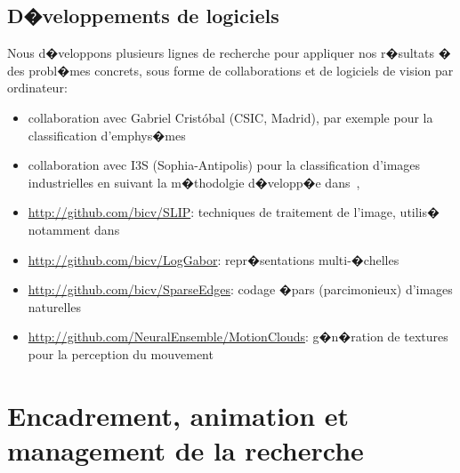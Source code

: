 \section{D�veloppements de logiciels} %

Nous d�veloppons plusieurs lignes de recherche pour appliquer nos r�sultats � des probl�mes concrets, sous forme de collaborations et de logiciels de vision par ordinateur:
\begin{itemize}
	\item  collaboration avec Gabriel Crist\'obal (CSIC, Madrid), par exemple pour la classification d'emphys�mes~\citep{Nava13} %
	\item  collaboration avec I3S (Sophia-Antipolis) pour la classification d'images industrielles en suivant la m�thodolgie d�velopp�e dans~\citep{PerrinetBednar15},
	\item \url{http://github.com/bicv/SLIP}: techniques de traitement de l'image, utilis� notamment dans~\citep{Perrinet15bicv,Ravello16droplets,PerrinetBednar15,Perrinet15eusipco,Perrinet16EUVIP}
	\item \url{http://github.com/bicv/LogGabor}: repr�sentations multi-�chelles~\citep{Fischer07,Fischer07cv}
	\item \url{http://github.com/bicv/SparseEdges}: codage �pars (parcimonieux) d'images naturelles~\citep{Perrinet15bicv}
	\item \url{http://github.com/NeuralEnsemble/MotionClouds}: g�n�ration de textures pour la perception du mouvement~\citep{Sanz12,Vacher15nips}
\end{itemize}



\chapter{Encadrement, animation et management de la recherche}



